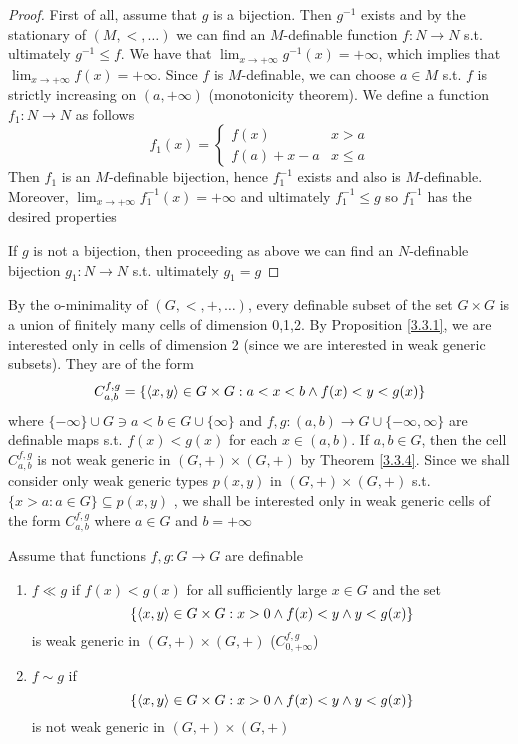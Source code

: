 \documentclass[11pt]{article}
\begin{document}
\begin{proof}
First of all, assume that \(g\) is a bijection. Then \(g^{-1}\) exists and by the stationary
of \((M,<,\dots)\) we can find an \(M\)-definable function \(f:N\to N\) s.t. ultimately \(g^{-1}\le f\).
We have that \(\lim_{x\to+\infty}g^{-1}(x)=+\infty\), which implies that \(\lim_{x\to+\infty}f(x)=+\infty\). Since \(f\)
is \(M\)-definable, we can choose \(a\in M\) s.t. \(f\) is strictly increasing on \((a,+\infty)\)
(monotonicity theorem). We define a function \(f_1:N\to N\) as follows
\begin{equation*}
f_1(x)=
\begin{cases}
f(x)&x>a\\
f(a)+x-a&x\le a
\end{cases}
\end{equation*}
Then \(f_1\) is an \(M\)-definable bijection, hence \(f_1^{-1}\) exists and also
is \(M\)-definable. Moreover, \(\lim_{x\to+\infty}f_1^{-1}(x)=+\infty\) and ultimately \(f^{-1}_1\le g\)
so \(f_1^{-1}\) has the desired properties

If \(g\) is not a bijection, then proceeding as above we can find an \(N\)-definable
bijection \(g_1:N\to N\) s.t. ultimately \(g_1=g\)
\end{proof}

By the o-minimality of \((G,<,+,\dots)\), every definable subset of the set \(G\times G\) is a union of
finitely many cells of dimension 0,1,2. By Proposition \ref{3.3.1}, we are interested only in
cells of dimension 2 (since we are interested in weak generic subsets). They are of the form
\begin{equation*}
C_{a,b}^{f,g}=\{\langle x,y\rangle\in G\times G:a<x<b\wedge f(x)<y<g(x)\}
\end{equation*}
where \(\{-\infty\}\cup G\ni a<b\in G\cup\{\infty\}\) and \(f,g:(a,b)\to G\cup\{-\infty,\infty\}\) are definable maps s.t. \(f(x)<g(x)\)
for each \(x\in(a,b)\). If \(a,b\in G\), then the cell \(C_{a,b}^{f,g}\) is not weak generic
in \((G,+)\times(G,+)\) by Theorem \ref{3.3.4}. Since we shall consider only weak generic
types \(p(x,y)\) in \((G,+)\times (G,+)\) s.t. \(\{x>a:a\in G\}\subseteq p(x,y)\) \label{Problem3}, we shall be interested only in
weak generic cells of the form \(C_{a,b}^{f,g}\) where \(a\in G\) and \(b=+\infty\)

\begin{definition}[]
Assume that functions \(f,g:G\to G\) are definable
\begin{enumerate}
\item \(f\ll g\) if \(f(x)<g(x)\) for all sufficiently large \(x\in G\) and the set
\begin{equation*}
\{\langle x,y\rangle\in G\times G:x>0\wedge f(x)<y\wedge y<g(x)\}
\end{equation*}
is weak generic in \((G,+)\times (G,+)\) (\(C_{0,+\infty}^{f,g}\))
\item \(f\sim g\) if
\begin{equation*}
\{\langle x,y\rangle\in G\times G:x>0\wedge f(x)<y\wedge y<g(x)\}
\end{equation*}
is not weak generic in \((G,+)\times (G,+)\)
\end{enumerate}
\end{definition}
\end{document}

